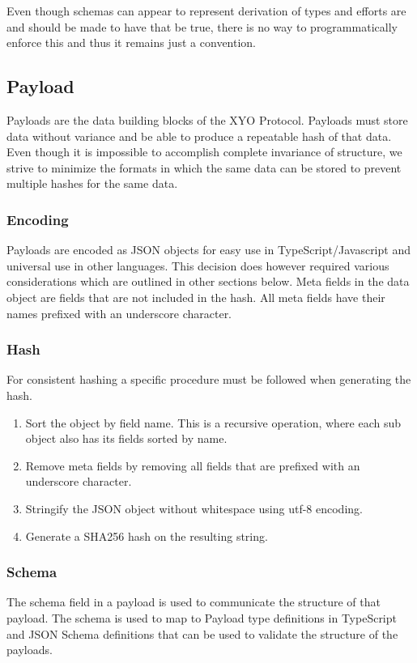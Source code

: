 \documentclass{article}
\begin{document}
Even though schemas can appear to represent derivation of types and efforts are and should be made to have that be true, there is no way to programmatically enforce this and thus it remains just a convention.

\subsection{Payload}
Payloads are the data building blocks of the XYO Protocol.  Payloads must store data without variance and be able to produce a repeatable hash of that data.  Even though it is impossible to accomplish complete invariance of structure, we strive to minimize the formats in which the same data can be stored to prevent multiple hashes for the same data.
\subsubsection{Encoding}
Payloads are encoded as JSON objects for easy use in TypeScript/Javascript and universal use in other languages.  This decision does however required various considerations which are outlined in other sections below. Meta fields in the data object are fields that are not included in the hash.  All meta fields have their names prefixed with an underscore character.

\subsubsection{Hash}
For consistent hashing a specific procedure must be followed when generating the hash.

\begin{enumerate}
\item Sort the object by field name.  This is a recursive operation, where each sub object also has its fields sorted by name.
\item Remove meta fields by removing all fields that are prefixed with an underscore character.
\item Stringify the JSON object without whitespace using utf-8 encoding.
\item Generate a SHA256 hash on the resulting string.
\end{enumerate}

\subsubsection{Schema}
The schema field in a payload is used to communicate the structure of that payload.  The schema is used to map to Payload type definitions in TypeScript and JSON Schema definitions that can be used to validate the structure of the payloads.
\end{document}
